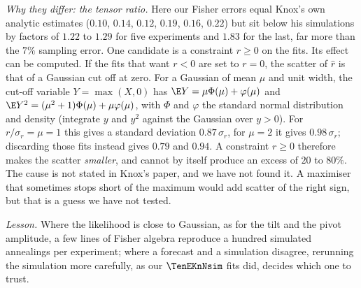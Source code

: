 \emph{Why they differ: the tensor ratio.} Here our Fisher errors equal Knox's own analytic estimates ($0.10$,
$0.14$, $0.12$, $0.19$, $0.16$, $0.22$) but sit below his simulations by factors of $1.22$ to $1.29$ for five
experiments and $1.83$ for the last, far more than the $7\%$ sampling error. One candidate is a constraint $r\ge0$
on the fits. Its effect can be computed. If the fits that want $r<0$ are set to $r=0$, the scatter of $\hat r$ is that
of a Gaussian cut off at zero. For a Gaussian of mean $\mu$ and unit width, the cut-off variable $Y=\max(X,0)$ has
$\E Y=\mu\Phi(\mu)+\varphi(\mu)$ and $\E Y^2=(\mu^2+1)\Phi(\mu)+\mu\varphi(\mu)$, with $\Phi$ and $\varphi$ the standard normal
distribution and density (integrate $y$ and $y^2$ against the Gaussian over $y>0$). For $r/\sigma_r=\mu=1$ this gives a
standard deviation $0.87\,\sigma_r$, for $\mu=2$ it gives $0.98\,\sigma_r$; discarding those fits instead gives $0.79$ and
$0.94$. A constraint $r\ge0$ therefore makes the scatter \emph{smaller}, and cannot by itself produce an excess of
$20$ to $80\%$. The cause is not stated in Knox's paper, and we have not found it. A maximiser that sometimes
stops short of the maximum would add scatter of the right sign, but that is a guess we have not tested.

\emph{Lesson.} Where the likelihood is close to Gaussian, as for the tilt and the pivot amplitude, a few lines
of Fisher algebra reproduce a hundred simulated annealings per experiment; where a forecast and a simulation
disagree, rerunning the simulation more carefully, as our $\TenEKnNsim$ fits did, decides which one to trust.

